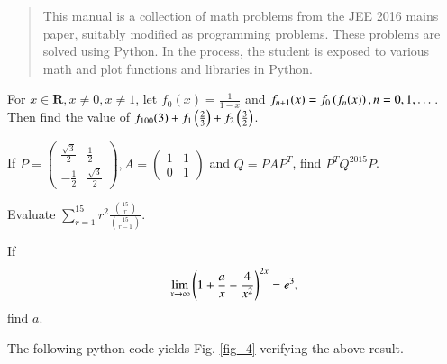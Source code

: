 \documentclass[journal,12pt,twocolumn]{IEEEtran}
\begin{document}
%
\IEEEpeerreviewmaketitle

\bigskip

\begin{abstract}
This manual is a collection of math problems from the JEE 2016 mains paper, suitably modified as programming problems. These problems are
solved using Python.  In the process, the student is exposed to various math and plot functions and libraries in Python. 
\end{abstract}
\begin{problem}
For $x \in \mathbf{R}, x \neq 0, x \neq 1$, let $f_0(x) = \frac{1}{1-x}$ 
and $f_{n+1}(x) = f_0\left(f_n(x)\right), n = 0, 1, \dots $.  Then find the value of
$f_{100}(3) + f_1\left(\frac{2}{3}\right)+f_2\left(\frac{3}{2}\right)$.
\end{problem}
%
\solution


%
\begin{problem}
If $P = 
\begin{pmatrix}
\frac{\sqrt{3}}{2} & \frac{1}{2} \\
-\frac{1}{2} & \frac{\sqrt{3}}{2}
\end{pmatrix}, A = 
\begin{pmatrix}
1 & 1 \\
0 & 1
\end{pmatrix}
$ and $Q = P A P^{T}$, find $P^{T}Q^{2015} P$.
\end{problem}
\solution


\begin{problem}
Evaluate $\sum_{r=1}^{15}r^2 \frac{\binom{15}{r}}{\binom{15}{r-1}}$.
\end{problem}
\solution


\begin{problem}
If 
\begin{align}
\label{prob_four}
\lim_{x \rightarrow \infty} \left(1 + \frac{a}{x} - \frac{4}{x^2}\right)^{2x} = e^3,
\end{align}
 find $a$.
\end{problem}
\solution 

The following python code yields Fig. \ref{fig_4} verifying the above result.
\end{document}
